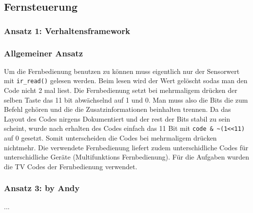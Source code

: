 \subsection{Fernsteuerung}
\label{fernsteuerung}

\subsubsection{Ansatz 1: Verhaltensframework}

\subsubsection{Allgemeiner Ansatz}

Um die Fernbedienung benutzen zu können muss eigentlich nur der Sensorwert mit \verb|ir_read()| gelesen werden. Beim lesen wird der Wert gelöscht sodas man den Code nicht 2 mal liest. Die Fernbedienung setzt bei mehrmaligem drücken der selben Taste das 11 bit abwächselnd auf 1 und 0. Man muss also die Bits die zum Befehl gehören und die die Zusatzinformationen beinhalten trennen. Da das Layout des Codes nirgens Dokumentiert und der rest der Bits stabil zu sein scheint, wurde nach erhalten des Codes einfach das 11 Bit mit \verb|code & ~(1<<11)| auf 0 gesetzt. Somit unterscheiden die Codes bei mehrmaligem drücken nichtmehr. Die verwendete Fernbedienung liefert zudem unterschidliche Codes für unterschidliche Geräte (Multifunktions Fernbedienung). Für die Aufgaben wurden die TV Codes der Fernbedienung verwendet.

\subsubsection{Ansatz 3: by Andy}
...
